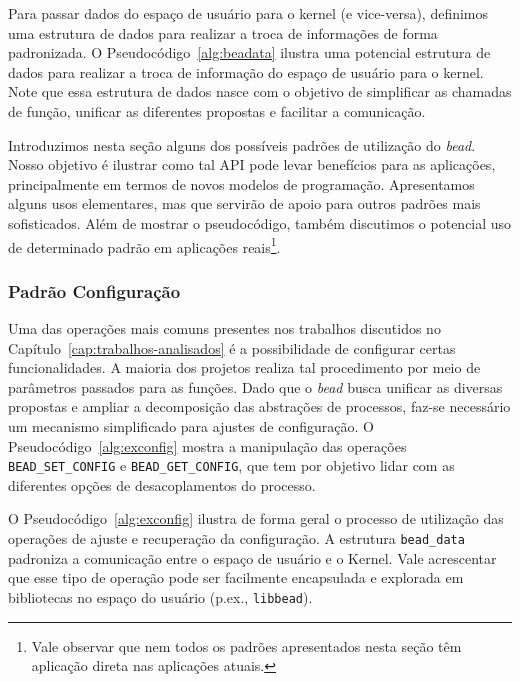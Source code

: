 

Para passar dados do espaço de usuário para o kernel (e vice-versa), definimos
uma estrutura de dados para realizar a troca de informações de forma
padronizada. O Pseudocódigo~\ref{alg:beadata} ilustra uma potencial estrutura
de dados para realizar a troca de informação do espaço de usuário para o kernel.
Note que essa estrutura de dados nasce com o objetivo de simplificar as
chamadas de função, unificar as diferentes propostas e facilitar a
comunicação.



Introduzimos nesta seção alguns dos possíveis padrões de utilização do
\emph{bead}. Nosso objetivo é ilustrar como tal API pode levar benefícios para
as aplicações, principalmente em termos de novos modelos de programação.
Apresentamos alguns usos elementares, mas que servirão de apoio para outros
padrões mais sofisticados. Além de mostrar o pseudocódigo, também discutimos o
potencial uso de determinado padrão em aplicações reais\footnote{Vale observar
que nem todos os padrões apresentados nesta seção têm aplicação direta nas
aplicações atuais.}.

\subsubsection{Padrão Configuração}

Uma das operações mais comuns presentes nos trabalhos discutidos no
Capítulo~\ref{cap:trabalhos-analisados} é a possibilidade de configurar certas
funcionalidades. A maioria dos projetos realiza tal procedimento por meio de
parâmetros passados para as funções. Dado que o \emph{bead} busca unificar as
diversas propostas e ampliar a decomposição das abstrações de processos, faz-se
necessário um mecanismo simplificado para ajustes de configuração. O
Pseudocódigo~\ref{alg:exconfig} mostra a manipulação das operações
\texttt{BEAD\_SET\_CONFIG} e \texttt{BEAD\_GET\_CONFIG}, que tem por objetivo
lidar com as diferentes opções de desacoplamentos do processo.



O Pseudocódigo~\ref{alg:exconfig} ilustra de forma geral o processo de
utilização das operações de ajuste e recuperação da configuração. A
estrutura \texttt{bead\_data} padroniza a comunicação entre o espaço de usuário
e o Kernel. Vale acrescentar que esse tipo de operação pode ser facilmente
encapsulada e explorada em bibliotecas no espaço do usuário (p.ex.,
\texttt{libbead}).

